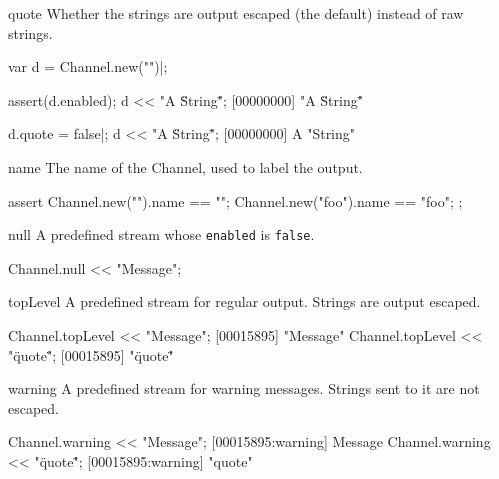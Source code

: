 \begin{urbiscriptapi}
\item[quote] Whether the strings are output escaped (the default)
  instead of raw strings.
\begin{urbiscript}
var d = Channel.new("")|;

assert(d.enabled);
d << "A \"String\"";
[00000000] "A \"String\""

d.quote = false|;
d << "A \"String\"";
[00000000] A "String"
\end{urbiscript}

\item[name] The name of the Channel, used to label the output.
\begin{urbiscript}
assert
{
  Channel.new("").name == "";
  Channel.new("foo").name == "foo";
};
\end{urbiscript}

\item[null] A predefined stream whose \lstinline|enabled| is
  \lstinline|false|.
\begin{urbiscript}
Channel.null << "Message";
\end{urbiscript}


\item[topLevel] A predefined stream for regular output.  Strings are
  output escaped.
\begin{urbiscript}
Channel.topLevel << "Message";
[00015895] "Message"
Channel.topLevel << "\"quote\"";
[00015895] "\"quote\""
\end{urbiscript}

\item[warning] A predefined stream for warning messages.  Strings sent
  to it are not escaped.
\begin{urbiscript}
Channel.warning << "Message";
[00015895:warning] Message
Channel.warning << "\"quote\"";
[00015895:warning] "quote"
\end{urbiscript}
\end{urbiscriptapi}

